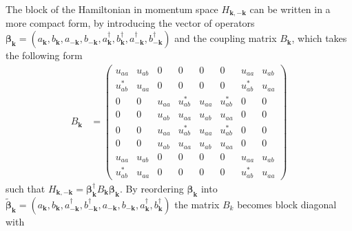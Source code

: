 The block of the Hamiltonian in momentum space $H_{\mathbf{k},-\mathbf{k}}$ can be written in a more compact form, by introducing the vector of operators $\mathbf{\beta}_\mathbf{k}=(a_\mathbf{k},b_\mathbf{k},a_{-\mathbf{k}},b_{-\mathbf{k}},a_{\mathbf{k}}^{\dagger},b_{\mathbf{k}}^{\dagger},a_{-\mathbf{k}}^{\dagger},b_{-\mathbf{k}}^{\dagger})$ and the coupling matrix $B_{\mathbf{k}}$, which takes the following form
\begin{align*}
    B_{\mathbf{k}} &=
    \begin{pmatrix}
u_{aa} & u_{ab} & 0 & 0 & 0 & 0 & u_{aa} & u_{ab} \\
u_{ab}^{*} & u_{aa} & 0 & 0 & 0 & 0 & u_{ab}^{*} & u_{aa} \\
0 & 0 & u_{aa} & u_{ab}^{*} & u_{aa} & u_{ab}^{*} & 0 & 0 \\
0 & 0 & u_{ab} & u_{aa} & u_{ab} & u_{aa} & 0 & 0 \\
0 & 0 & u_{aa} & u_{ab}^{*} & u_{aa} & u_{ab}^{*} & 0 & 0 \\
0 & 0 & u_{ab} & u_{aa} & u_{ab} & u_{aa} & 0 & 0 \\
u_{aa} & u_{ab} & 0 & 0 & 0 & 0 & u_{aa} & u_{ab} \\
u_{ab}^{*} & u_{aa} & 0 & 0 & 0 & 0 & u_{ab}^{*} & u_{aa}
\end{pmatrix}
\end{align*}
such that $H_{\mathbf{k},-\mathbf{k}} = \mathbf{\beta}_\mathbf{k}^{\dagger} B_{\mathbf{k}} \mathbf{\beta}_\mathbf{k}$. By reordering $\mathbf{\beta}_\mathbf{k}$ into $\tilde{\mathbf{\beta}}_\mathbf{k}=(a_\mathbf{k},b_\mathbf{k},a_{-\mathbf{k}}^{\dagger},b_{-\mathbf{k}}^{\dagger},a_{-\mathbf{k}},b_{-\mathbf{k}},a_{\mathbf{k}}^{\dagger},b_{\mathbf{k}}^{\dagger})$ the matrix $B_k$ becomes block diagonal with

